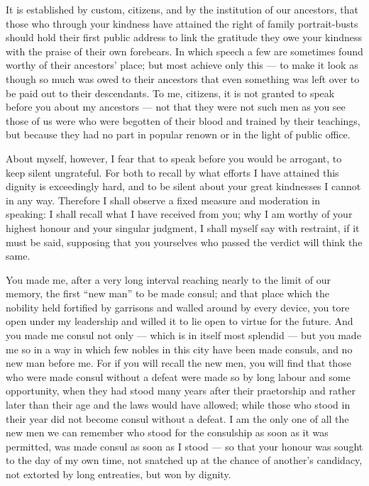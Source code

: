 
 It is established by custom, citizens, and by the institution of our ancestors, that those who through your kindness have attained the right of family portrait-busts should hold their first public address to link the gratitude they owe your kindness with the praise of their own forebears. In which speech a few are sometimes found worthy of their ancestors' place; but most achieve only this --- to make it look as though so much was owed to their ancestors that even something was left over to be paid out to their descendants. To me, citizens, it is not granted to speak before you about my ancestors --- not that they were not such men as you see those of us were who were begotten of their blood and trained by their teachings, but because they had no part in popular renown or in the light of public office.

 About myself, however, I fear that to speak before you would be arrogant, to keep silent ungrateful. For both to recall by what efforts I have attained this dignity is exceedingly hard, and to be silent about your great kindnesses I cannot in any way. Therefore I shall observe a fixed measure and moderation in speaking: I shall recall what I have received from you; why I am worthy of your highest honour and your singular judgment, I shall myself say with restraint, if it must be said, supposing that you yourselves who passed the verdict will think the same.

 You made me, after a very long interval reaching nearly to the limit of our memory, the first ``new man'' to be made consul; and that place which the nobility held fortified by garrisons and walled around by every device, you tore open under my leadership and willed it to lie open to virtue for the future. And you made me consul not only --- which is in itself most splendid --- but you made me so in a way in which few nobles in this city have been made consuls, and no new man before me. For if you will recall the new men, you will find that those who were made consul without a defeat were made so by long labour and some opportunity, when they had stood many years after their praetorship and rather later than their age and the laws would have allowed; while those who stood in their year did not become consul without a defeat. I am the only one of all the new men we can remember who stood for the consulship as soon as it was permitted, was made consul as soon as I stood --- so that your honour was sought to the day of my own time, not snatched up at the chance of another's candidacy, not extorted by long entreaties, but won by dignity.

